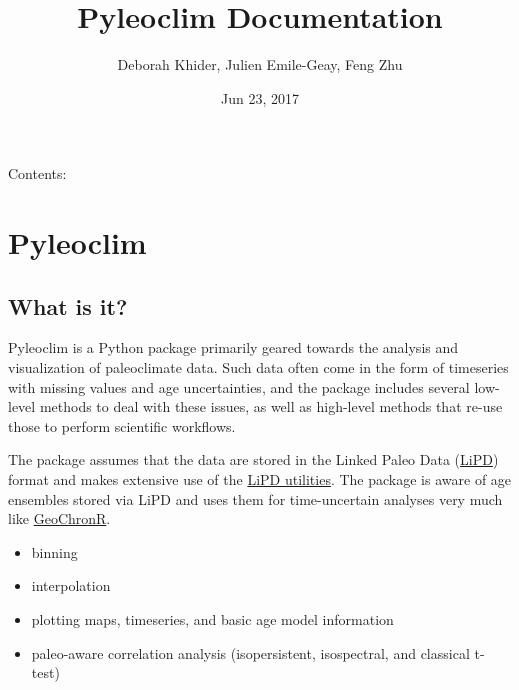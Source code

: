 \documentclass[letterpaper,10pt,english]{sphinxmanual}
\title{Pyleoclim Documentation}
\date{Jun 23, 2017}
\author{Deborah Khider, Julien Emile-Geay, Feng Zhu}
\begin{document}
\maketitle
\sphinxtableofcontents
{}\label{\detokenize{index::doc}}


Contents:


\chapter{Pyleoclim}
\label{\detokenize{Introduction:welcome-to-pyleoclim-s-documentation}}\label{\detokenize{Introduction::doc}}\label{\detokenize{Introduction:pyleoclim}}

\section{What is it?}
\label{\detokenize{Introduction:what-is-it}}
Pyleoclim is a Python package primarily geared towards the analysis and visualization of paleoclimate data.
Such data often come in the form of timeseries with missing values and age uncertainties, and the package
includes several low-level methods to deal with these issues, as well as high-level methods that re-use those
to perform scientific workflows.

The package assumes that the data are stored in the Linked Paleo Data (\href{http://www.clim-past.net/12/1093/2016/}{LiPD})
format and makes extensive use of the \href{http://nickmckay.github.io/LiPD-utilities/}{LiPD utilities}. The package
is aware of age ensembles stored via LiPD and uses them for time-uncertain analyses very much like \href{http://nickmckay.github.io/GeoChronR/}{GeoChronR}.

\begin{itemize}
\item {} 
binning

\item {} 
interpolation

\item {} 
plotting maps, timeseries, and basic age model information

\item {} 
paleo-aware correlation analysis (isopersistent, isospectral, and classical t-test)

\end{itemize}
\end{document}
